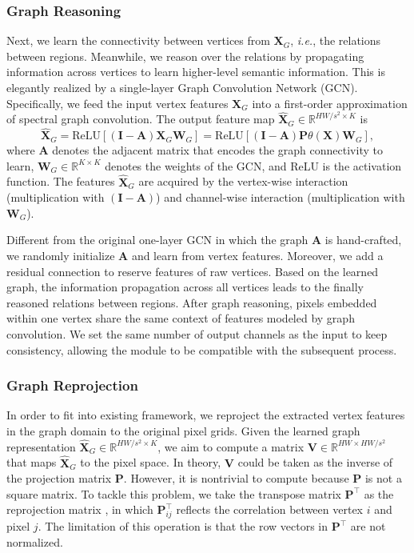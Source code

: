 \documentclass[runningheads]{llncs}
\def\ie{{\it i.e.}}
\def\I{{\mathbf I}}
\def\A{{\mathbf A}}
\def\W{{\mathbf W}}
\def\P{{\mathbf P}}
\def\X{{\mathbf X}}
\begin{document}
\subsubsection{Graph Reasoning}

Next, we learn the connectivity between vertices from $\X_G$, \ie, the relations between regions. 
Meanwhile, we reason over the relations by propagating information across vertices to learn higher-level semantic information. 
This is elegantly realized by a single-layer Graph Convolution Network (GCN). 
Specifically, we feed the input vertex features $\X_G$ into a first-order approximation of spectral graph convolution. 
The output feature map $\hat{\X}_G \in \mathbb{R}^{HW/s^2 \times K}$ is
\begin{equation}
    \hat{\X}_G = \text{ReLU}\left[(\I - \A)\X_G\W_G\right] = \text{ReLU}\left[(\I - \A)\P\theta(\X)\W_G\right],
\end{equation}
where $\A$ denotes the adjacent matrix that encodes the graph connectivity to learn, $\W_G \in \mathbb{R}^{K \times K}$ denotes the weights of the GCN, and ReLU is the activation function. 
The features $\hat{\X}_G $ are acquired by the vertex-wise interaction (multiplication with $(\I - \A)$) and channel-wise interaction (multiplication with $\W_G$). 

Different from the original one-layer GCN \cite{kipf2016semi} in which the graph $\A$ is hand-crafted, we randomly initialize $\A$ and learn from vertex features.
Moreover, we add a residual connection to reserve features of raw vertices. 
Based on the learned graph, the information propagation across all vertices leads to the finally reasoned relations between regions.  
After graph reasoning, pixels embedded within one vertex share the same context of features modeled by graph convolution. 
We set the same number of output channels as the input to keep consistency, allowing the module to be compatible with the subsequent process.


\subsubsection{Graph Reprojection}

In order to fit into existing framework, we reproject the extracted vertex features in the graph domain to the original pixel grids.
Given the learned graph representation $\hat{\X}_G \in \mathbb{R}^{HW/s^2 \times K}$, we aim to compute a matrix $\mathbf{V} \in \mathbb{R}^{HW \times HW/s^2}$ that maps $\hat{\X}_G$ to the pixel space.
In theory, $\mathbf{V}$ could be taken as the inverse of the projection matrix $\P$. However, it is nontrivial to compute because $\P$ is not a square matrix. 
To tackle this problem, we take the transpose matrix $\P^{\top}$ as the reprojection matrix \cite{li2018beyond}, in which $\P^{\top}_{ij}$ reflects the correlation between vertex $i$ and pixel $j$. The limitation of this operation is that the row vectors in $\P^{\top}$ are not normalized.
\end{document}

